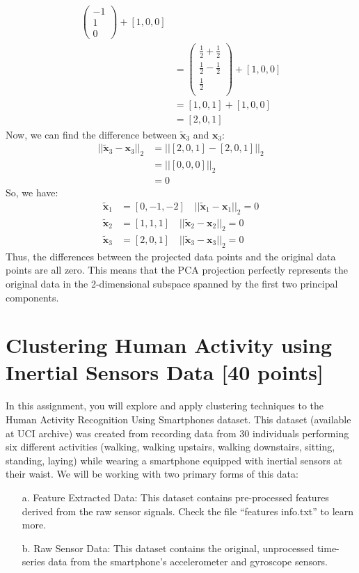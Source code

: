 \documentclass[a3paper,12pt]{extarticle} %
\begin{document}
\begin{enumerate}
\begin{align}
\begin{pmatrix}
-1\\
1\\
0
\end{pmatrix} + [1, 0, 0]\\
&= \begin{pmatrix}
\frac{1}{2} + \frac{1}{2}\\
\frac{1}{2} - \frac{1}{2}\\
\frac{1}{2}\\
\end{pmatrix} + [1, 0, 0]\\
&= [1, 0, 1] + [1, 0, 0]\\
&= [2, 0, 1]
\end{align}
Now, we can find the difference between $\tilde{\mathbf{x}}_3$ and $\mathbf{x}_3$:
\begin{align}
||\tilde{\mathbf{x}}_3 - \mathbf{x}_3||_2 &= ||[2, 0, 1] - [2, 0, 1]||_2\\
&= ||[0, 0, 0]||_2\\
&= 0
\end{align}
So, we have:
\begin{align}
\tilde{\mathbf{x}}_1 &= [0, -1, -2] \quad ||\tilde{\mathbf{x}}_1 - \mathbf{x}_1||_2 = 0\\
\tilde{\mathbf{x}}_2 &= [1, 1, 1] \quad ||\tilde{\mathbf{x}}_2 - \mathbf{x}_2||_2 = 0\\
\tilde{\mathbf{x}}_3 &= [2, 0, 1] \quad ||\tilde{\mathbf{x}}_3 - \mathbf{x}_3||_2 = 0
\end{align}
Thus, the differences between the projected data points and the original data points are all zero. This means that the PCA projection perfectly represents the original data in the 2-dimensional subspace spanned by the first two principal components.

\newpage
\section{Clustering Human Activity using Inertial Sensors Data [40 points]}
In this assignment, you will explore and apply clustering techniques to the Human Activity Recognition Using Smartphones dataset. This dataset (available at UCI archive) was created from recording data from 30 individuals performing six different activities (walking, walking upstairs, walking downstairs, sitting, standing, laying) while wearing a smartphone equipped with inertial sensors at their waist. We will be working with two primary forms of this data:

\begin{itemize}
\item[a.] Feature Extracted Data: This dataset contains pre-processed features derived from the raw sensor signals. Check the file ``features info.txt'' to learn more.
\item[b.] Raw Sensor Data: This dataset contains the original, unprocessed time-series data from the smartphone's accelerometer and gyroscope sensors.
\end{itemize}


\end{enumerate}
\end{document}
